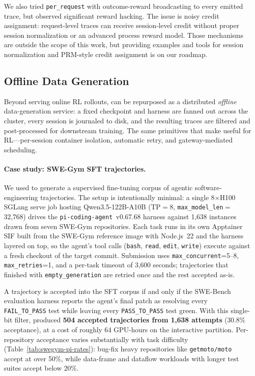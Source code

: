 We also tried \texttt{per\_request} with outcome-reward broadcasting to every emitted trace, but observed significant reward hacking. The issue is noisy credit assignment: request-level traces can receive session-level credit without proper session normalization or an advanced process reward model. Those mechanisms are outside the scope of this work, but providing examples and tools for session normalization and PRM-style credit assignment is on our roadmap.



\subsection{Offline Data Generation}
\label{sec:offline-data-gen}

Beyond serving online RL rollouts, \polar can be repurposed as a distributed
\emph{offline} data-generation service: a fixed checkpoint and harness are
fanned out across the cluster, every session is journaled to disk, and the
resulting traces are filtered and post-processed for downstream training.
The same primitives that make \polar useful for RL---per-session container
isolation, automatic retry, and gateway-mediated scheduling.

\paragraph{Case study: SWE-Gym SFT trajectories.}
We used \polar to generate a supervised fine-tuning corpus of agentic
software-engineering trajectories. The setup is intentionally minimal: a single
8$\times$H100 SGLang serve job hosting Qwen3.5-122B-A10B (TP$=$8,
\texttt{max\_model\_len}$=$32{,}768) drives the
\texttt{pi-coding-agent}~v0.67.68 harness against 1{,}638 instances drawn from
seven SWE-Gym repositories. Each task runs in its own Apptainer SIF built from
the SWE-Gym reference image with Node.js~22 and the harness layered on top, so
the agent's tool calls (\texttt{bash}, \texttt{read}, \texttt{edit},
\texttt{write}) execute against a fresh checkout of the target commit. Submission
uses \texttt{max\_concurrent}=5--8, \texttt{max\_retries}=1, and a per-task
timeout of 3{,}600 seconds; trajectories that finished with
\texttt{empty\_generation} are retried once and the rest accepted as-is.

A trajectory is accepted into the SFT corpus if and only if the SWE-Bench
evaluation harness reports the agent's final patch as resolving every
\texttt{FAIL\_TO\_PASS} test while leaving every \texttt{PASS\_TO\_PASS} test
green. With this single-bit filter, \polar produced \textbf{504 accepted
trajectories from 1{,}638 attempts} (30.8\% acceptance), at a cost of roughly
64 GPU-hours on the interactive partition. Per-repository acceptance varies
substantially with task difficulty (Table~\ref{tab:swegym-pi-rates}): bug-fix
heavy repositories like \texttt{getmoto/moto} accept at over 50\%, while
data-frame and dataflow workloads with longer test suites accept below 20\%.

